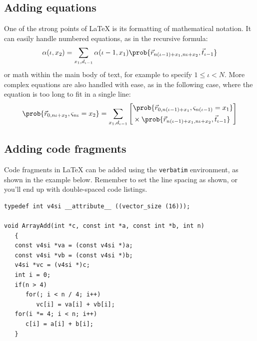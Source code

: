 \subsection{Adding equations}
One of the strong points of \LaTeX{} is its formatting of mathematical notation.
It can easily handle numbered equations, as in the recursive formula:
\begin{equation}
\alpha(\iota,x_2) = \sum_{x_1,d_{\iota-1}} \alpha(\iota-1,x_1)
   \prob{ \vec{r}_{n(\iota-1)+x_1,n\iota+x_2}, \vec{t}_{\iota-1} }
\end{equation}
or math within the main body of text, for example to specify $1 \leq \iota
< N$.
More complex equations are also handled with ease, as in the following case,
where the equation is too long to fit in a single line:
\begin{equation}
\prob{\vec{r}_{0,n\iota+x_2}, \varsigma_{n\iota}=x_2}
= \sum_{x_1,d_{\iota-1}} \left[
\begin{split}
   & \prob{\vec{r}_{0,n(\iota-1)+x_1}, \varsigma_{n(\iota-1)}=x_1} \\
   & \times \prob{ \vec{r}_{n(\iota-1)+x_1,n\iota+x_2}, \vec{t}_{\iota-1} }
\end{split} \right]
\end{equation}

\subsection{Adding code fragments}
Code fragments in \LaTeX{} can be added using the \verb|verbatim| environment,
as shown in the example below.
Remember to set the line spacing as shown, or you'll end up with double-spaced
code listings.

\singlespaced
\begin{verbatim}
typedef int v4si __attribute__ ((vector_size (16)));

void ArrayAdd(int *c, const int *a, const int *b, int n)
   {
   const v4si *va = (const v4si *)a;
   const v4si *vb = (const v4si *)b;
   v4si *vc = (v4si *)c;
   int i = 0;
   if(n > 4)
      for(; i < n / 4; i++)
         vc[i] = va[i] + vb[i];
   for(i *= 4; i < n; i++)
      c[i] = a[i] + b[i];
   }
\end{verbatim}
\doublespaced

